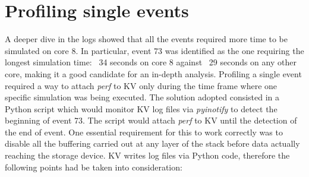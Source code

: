 \documentclass[a4paper]{jpconf}
\begin{document}
\section{Profiling single events}
A deeper dive in the logs showed that all the events required more time to be 
simulated on core 8. In particular, event 73 was identified as the one
requiring the longest simulation time: ~34 seconds on core 8 against ~29 seconds
on any other core, making it a good candidate for an in-depth analysis. Profiling 
a single event required a way to attach \textit{perf} to KV only during the time frame
where one specific simulation was being executed. The solution adopted consisted
in a Python script which would monitor KV log files via \textit{pyinotify} to detect
the beginning of event 73. The script would attach \textit{perf} to KV until the
detection of the end of event. One essential requirement for this to work correctly
was to disable all the buffering carried out at any layer of the stack before
data actually reaching the storage device. KV writes log files via Python code,
therefore the following points had be taken into consideration:

\end{document}
